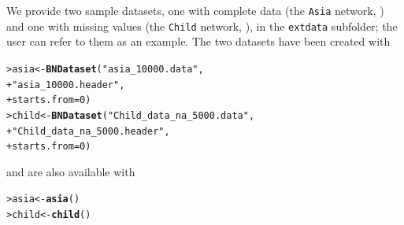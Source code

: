\documentclass{article}\usepackage[]{graphicx}\usepackage[]{color}
\makeatletter
\newcommand{\hlnum}[1]{\textcolor[rgb]{0.686,0.059,0.569}{#1}}%
\newcommand{\hlstr}[1]{\textcolor[rgb]{0.192,0.494,0.8}{#1}}%
\newcommand{\hlstd}[1]{\textcolor[rgb]{0.345,0.345,0.345}{#1}}%
\newcommand{\hlkwb}[1]{\textcolor[rgb]{0.69,0.353,0.396}{#1}}%
\newcommand{\hlkwc}[1]{\textcolor[rgb]{0.333,0.667,0.333}{#1}}%
\newcommand{\hlkwd}[1]{\textcolor[rgb]{0.737,0.353,0.396}{\textbf{#1}}}%
\newenvironment{kframe}{%
 \def\at@end@of@kframe{}%
 \ifinner\ifhmode%
  \def\at@end@of@kframe{\end{minipage}}%
  \begin{minipage}{\columnwidth}%
 \fi\fi%
 \def\FrameCommand##1{\hskip\@totalleftmargin \hskip-\fboxsep
 \colorbox{shadecolor}{##1}\hskip-\fboxsep
     \hskip-\linewidth \hskip-\@totalleftmargin \hskip\columnwidth}%
 \MakeFramed {\advance\hsize-\width
   \@totalleftmargin\z@ \linewidth\hsize
   \@setminipage}}%
 {\par\unskip\endMakeFramed%
 \at@end@of@kframe}
\newenvironment{knitrout}{}{} %
\makeatother
\begin{document}
We provide two sample datasets, one with complete data (the \texttt{Asia} network, \citet*{lauritzen1988local}) and one with missing values
(the \texttt{Child} network, \citet*{spiegelhalter1993bayesian}), in the \texttt{extdata} subfolder;
the user can refer to them as an example. The two datasets have been created with

\begin{knitrout}
\color{fgcolor}\begin{kframe}
\begin{alltt}
\hlstd{> }\hlstd{asia} \hlkwb{<-} \hlkwd{BNDataset}\hlstd{(}\hlstr{"asia_10000.data"}\hlstd{,}
\hlstd{+ }                  \hlstr{"asia_10000.header"}\hlstd{,}
\hlstd{+ }                  \hlkwc{starts.from}\hlstd{=}\hlnum{0}\hlstd{)}
\hlstd{> }\hlstd{child} \hlkwb{<-} \hlkwd{BNDataset}\hlstd{(}\hlstr{"Child_data_na_5000.data"}\hlstd{,}
\hlstd{+ }                   \hlstr{"Child_data_na_5000.header"}\hlstd{,}
\hlstd{+ }                   \hlkwc{starts.from}\hlstd{=}\hlnum{0}\hlstd{)}
\end{alltt}
\end{kframe}
\end{knitrout}

and are also available with

\begin{knitrout}
\color{fgcolor}\begin{kframe}
\begin{alltt}
\hlstd{> }\hlstd{asia}  \hlkwb{<-} \hlkwd{asia}\hlstd{()}
\hlstd{> }\hlstd{child} \hlkwb{<-} \hlkwd{child}\hlstd{()}
\end{alltt}
\end{kframe}
\end{knitrout}
\end{document}
